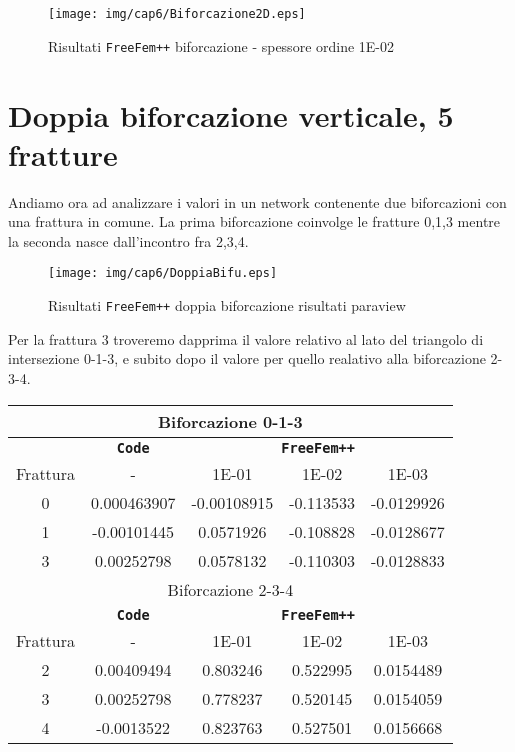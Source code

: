 \begin{figure}[h!]
\centering
\texttt{[image: img/cap6/Biforcazione2D.eps]}
\caption{Risultati \texttt{FreeFem++} biforcazione - spessore ordine 1E-02 }\label{Biforcazione1E-02}
\end{figure}

\section{Doppia biforcazione verticale, 5 fratture}
Andiamo ora ad analizzare i valori in un network contenente due biforcazioni con una frattura in comune.
La prima biforcazione coinvolge le fratture 0,1,3 mentre la seconda nasce dall'incontro fra 2,3,4.\\

\begin{figure}[h!]
\centering
\texttt{[image: img/cap6/DoppiaBifu.eps]}
\caption{Risultati \texttt{FreeFem++} doppia biforcazione risultati paraview }\label{DoppiaBifuVerticalParaview}
\end{figure}

Per la frattura 3 troveremo dapprima il valore relativo al lato del triangolo di intersezione 0-1-3, e subito dopo il valore per quello realativo alla biforcazione 2-3-4.

\begin{center}
\begin{tabular}{|c|c|c|c|c|}
\hline
\multicolumn{5}{|c|}{Biforcazione 0-1-3}\\
\hline
 & \textbf{\texttt{Code}} & \multicolumn{3}{|c|}{\textbf{\texttt{FreeFem++}}} \\
\hline
\multicolumn{1}{|c|}{Frattura} & - &
\multicolumn{1}{|c|}{1E-01} & 1E-02 & 1E-03 \\
\hline
 0 & 0.000463907 & -0.00108915 & -0.113533 & -0.0129926\\
 1 & -0.00101445 & 0.0571926 & -0.108828 & -0.0128677\\  
 3 & 0.00252798 & 0.0578132 & -0.110303 & -0.0128833\\
\hline
\multicolumn{5}{|c|}{Biforcazione 2-3-4}\\
\hline
 & \textbf{\texttt{Code}} & \multicolumn{3}{|c|}{\textbf{\texttt{FreeFem++}}} \\
\hline
\multicolumn{1}{|c|}{Frattura} & - &
\multicolumn{1}{|c|}{1E-01} & 1E-02 & 1E-03 \\
\hline
 2 & 0.00409494 & 0.803246 & 0.522995 & 0.0154489\\ 
 3 & 0.00252798 & 0.778237 & 0.520145 & 0.0154059\\
 4 & -0.0013522 & 0.823763 & 0.527501 & 0.0156668\\
\hline
\end{tabular}
\end{center}

